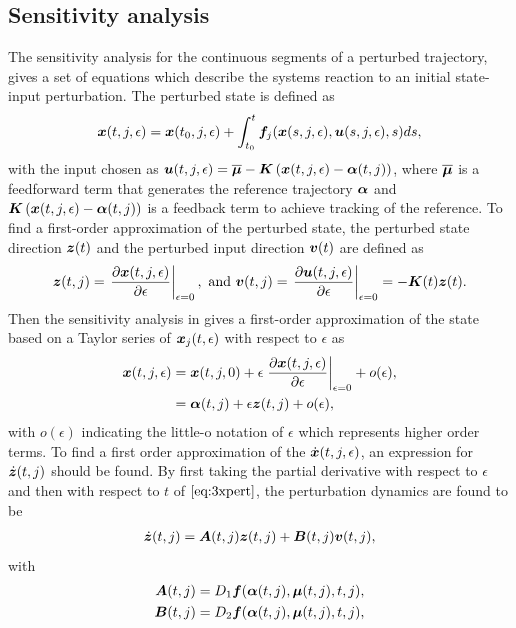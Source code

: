 \documentclass[../DC2017114Bouma.tex]{subfiles}
\begin{document}
\subsection{Sensitivity analysis}
The sensitivity analysis for the continuous segments of a perturbed trajectory, gives a set of equations which describe the systems reaction to an initial state-input perturbation. The perturbed state is defined as
\begin{align}
{\boldsymbol{x}}(t,j,\epsilon) = {\boldsymbol{x}}(t_0,j,\epsilon) + \int_{t_0}^{t}{\boldsymbol{f}}_j({\boldsymbol{x}}(s,j,\epsilon),{\boldsymbol{u}}(s,j,\epsilon),s)ds,\label{eq:3xpert}
\end{align}
with the input chosen as ${\boldsymbol{u}}(t,j,\epsilon) = \overline{\boldsymbol{\mu}} - {\boldsymbol{K}}\left({\boldsymbol{x}}(t,j,\epsilon)-\boldsymbol{\alpha}(t,j)\right)$, where $\overline{\boldsymbol{\mu}}$ is a feedforward term that generates the reference trajectory $\boldsymbol{\alpha}$ and ${\boldsymbol{K}}\left({\boldsymbol{x}}(t,j,\epsilon)-\boldsymbol{\alpha}(t,j)\right)$ is a feedback term to achieve tracking of the reference. To find a first-order approximation of the perturbed state, the perturbed state direction ${\boldsymbol{z}}(t)$ and the perturbed input direction ${\boldsymbol{v}}(t)$ are defined as
\begin{align}
{\boldsymbol{z}}(t,j) = \left.\frac{\partial{\boldsymbol{x}}(t,j,\epsilon)}{\partial\epsilon}\right|_{\epsilon=0},\text{ and } {\boldsymbol{v}}(t,j) = \left.\frac{\partial{\boldsymbol{u}}(t,j,\epsilon)}{\partial\epsilon}\right|_{\epsilon=0}=-{\boldsymbol{K}}(t){\boldsymbol{z}}(t).
\end{align}
Then the sensitivity analysis in \cite{Khalil1996} gives a first-order approximation of the state based on a Taylor series of ${\boldsymbol{x}}_j(t,\epsilon)$ with respect to $\epsilon$ as
\begin{align}
{\boldsymbol{x}}(t,j,\epsilon) &= {\boldsymbol{x}}(t,j,0) + \epsilon\left.\frac{\partial{\boldsymbol{x}}(t,j,\epsilon)}{\partial\epsilon}\right|_{\epsilon=0} + o(\epsilon),\label{eq:3taylor}\\
&= \boldsymbol{\alpha}(t,j) + \epsilon{\boldsymbol{z}}(t,j) + o(\epsilon),
\end{align}
with $o(\epsilon)$ indicating the little-o notation of $\epsilon$ which represents higher order terms. To find a first order approximation of the $\dot{{\boldsymbol{x}}}(t,j,\epsilon)$, an expression for $\dot{{\boldsymbol{z}}}(t,j)$ should be found. By first taking the partial derivative with respect to $\epsilon$ and then with respect to $t$ of $\eqref{eq:3xpert}$, the perturbation dynamics are found to be
\begin{align}
\dot{{\boldsymbol{z}}}(t,j) = {\boldsymbol{A}}(t,j){\boldsymbol{z}}(t,j) +{\boldsymbol{B}}(t,j){\boldsymbol{v}}(t,j),
\end{align}
with
\begin{align}
{\boldsymbol{A}}(t,j) &= D_1{\boldsymbol{f}}(\boldsymbol{\alpha}(t,j),\boldsymbol{\mu}(t,j),t,j),\\
{\boldsymbol{B}}(t,j) &= D_2{\boldsymbol{f}}(\boldsymbol{\alpha}(t,j),\boldsymbol{\mu}(t,j),t,j),
\end{align}
\end{document}
